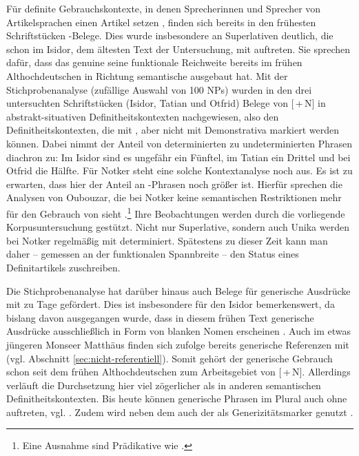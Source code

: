 Für definite Gebrauchskontexte, in denen Sprecherinnen und Sprecher von Artikelsprachen einen Artikel setzen  \parencite[832]{Himmelmann2001}, finden sich bereits in den frühesten Schriftstücken  -Belege. Dies wurde insbesondere an Superlativen deutlich, die schon im Isidor, dem ältesten Text der Untersuchung, mit  auftreten. Sie sprechen dafür, dass das genuine  seine funktionale Reichweite bereits im frühen Althochdeutschen in Richtung semantische   ausgebaut hat. Mit der Stichprobenanalyse (zufällige Auswahl von 100  NPs) wurden in den drei untersuchten Schriftstücken (Isidor, Tatian und Otfrid) Belege von [\,+\,N] in abstrakt-situativen  Definitheitskontexten  nachgewiesen, also den Definitheitskontexten, die mit , aber nicht mit Demonstrativa  markiert werden können. Dabei nimmt der Anteil von determinierten zu undeterminierten Phrasen diachron zu: Im Isidor sind es ungefähr ein Fünftel, im Tatian ein Drittel und bei Otfrid die Hälfte. Für Notker steht eine solche Kontextanalyse noch aus. Es ist zu erwarten, dass hier der Anteil an -Phrasen noch größer ist. Hierfür sprechen die Analysen von Oubouzar, die bei Notker keine semantischen Restriktionen mehr für den Gebrauch von  sieht \parencite[573]{Oubouzar1989}.\footnote{Eine Ausnahme sind Prädikative  wie .} Ihre Beobachtungen werden durch die vorliegende Korpusuntersuchung  gestützt. Nicht nur Superlative, sondern auch Unika  werden bei Notker regelmäßig mit  determiniert. Spätestens zu dieser Zeit kann man daher -- gemessen an der funktionalen Spannbreite --  den Status eines Definitartikels  zuschreiben. 

Die Stichprobenanalyse hat darüber hinaus auch Belege für generische  Ausdrücke mit  zu Tage gefördert. Dies ist insbesondere für den Isidor bemerkenswert, da bislang davon ausgegangen wurde, dass in diesem frühen Text generische  Ausdrücke ausschließlich in Form von blanken Nomen erscheinen \parencites()()[80]{Oubouzar1992}[145]{Kraiss2012}. Auch im etwas jüngeren Monseer Matthäus finden sich \textcite{Hodler1954} zufolge bereits generische  Referenzen mit  (vgl. Abschnitt \ref{sec:nicht-referentiell}). Somit gehört der generische  Gebrauch schon seit dem frühen Althochdeutschen zum Arbeitsgebiet von [\,+\,N].  Allerdings verläuft die Durchsetzung hier viel zögerlicher als in anderen semantischen   Definitheitskontexten. Bis heute können generische  Phrasen im  Plural auch ohne  auftreten, vgl.  \parencite[][145]{Barton2015}. Zudem wird neben dem  auch der  als Generizitätsmarker  genutzt \parencite{Petrova2020}.

